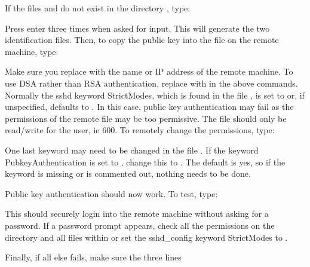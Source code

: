  If the files  and  do not exist in the directory , type: 
  


 Press enter three times when asked for input.  This will generate the two identification files.  Then, to copy the public key into the  file on the remote machine, type: 
  


 Make sure you replace  with the name or IP address of the remote machine.  To use DSA rather than RSA authentication, replace  with  in the above commands. Normally the sshd keyword StrictModes, which is found in the file , is set to  or, if unspecified, defaults to .  In this case, public key authentication may fail as the permissions of the remote file  may be too permissive.  The file should only be read/write for the user, ie 600.  To remotely change the permissions, type: 
  


 One last keyword may need to be changed in the file .  If the keyword PubkeyAuthentication is set to , change this to .  The default is yes, so if the keyword is missing or is commented out, nothing needs to be done. 
  

 Public key authentication should now work.  To test, type: 
  


 This should securely login into the remote machine without asking for a password.  If a password prompt appears, check all the permissions on the directory  and all files within or set the sshd\_config keyword StrictModes to . 
  




 Finally, if all else fails, make sure the three lines 
  

